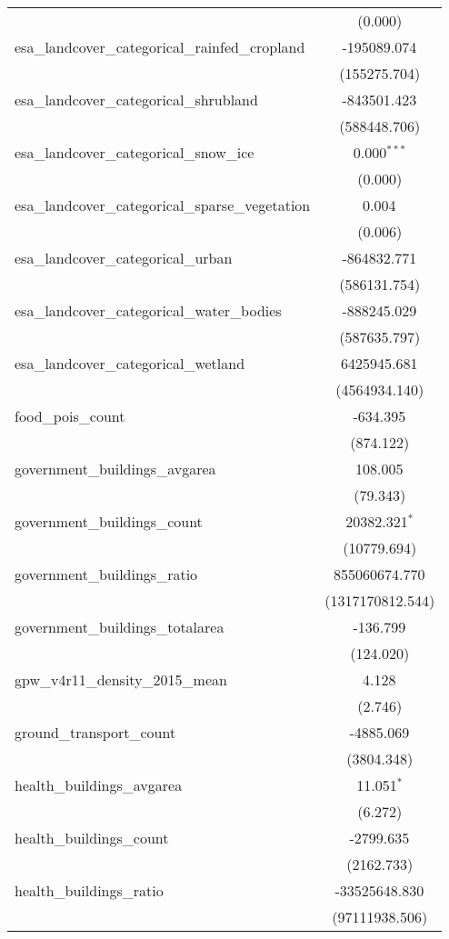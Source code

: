 \begin{table}[!htbp]
\begin{tabular}{@{\extracolsep{5pt}}lc}
  & (0.000) \\
 esa_landcover_categorical_rainfed_cropland & -195089.074$^{}$ \\
  & (155275.704) \\
 esa_landcover_categorical_shrubland & -843501.423$^{}$ \\
  & (588448.706) \\
 esa_landcover_categorical_snow_ice & 0.000$^{***}$ \\
  & (0.000) \\
 esa_landcover_categorical_sparse_vegetation & 0.004$^{}$ \\
  & (0.006) \\
 esa_landcover_categorical_urban & -864832.771$^{}$ \\
  & (586131.754) \\
 esa_landcover_categorical_water_bodies & -888245.029$^{}$ \\
  & (587635.797) \\
 esa_landcover_categorical_wetland & 6425945.681$^{}$ \\
  & (4564934.140) \\
 food_pois_count & -634.395$^{}$ \\
  & (874.122) \\
 government_buildings_avgarea & 108.005$^{}$ \\
  & (79.343) \\
 government_buildings_count & 20382.321$^{*}$ \\
  & (10779.694) \\
 government_buildings_ratio & 855060674.770$^{}$ \\
  & (1317170812.544) \\
 government_buildings_totalarea & -136.799$^{}$ \\
  & (124.020) \\
 gpw_v4r11_density_2015_mean & 4.128$^{}$ \\
  & (2.746) \\
 ground_transport_count & -4885.069$^{}$ \\
  & (3804.348) \\
 health_buildings_avgarea & 11.051$^{*}$ \\
  & (6.272) \\
 health_buildings_count & -2799.635$^{}$ \\
  & (2162.733) \\
 health_buildings_ratio & -33525648.830$^{}$ \\
  & (97111938.506) \\

\end{tabular}
\end{table}
